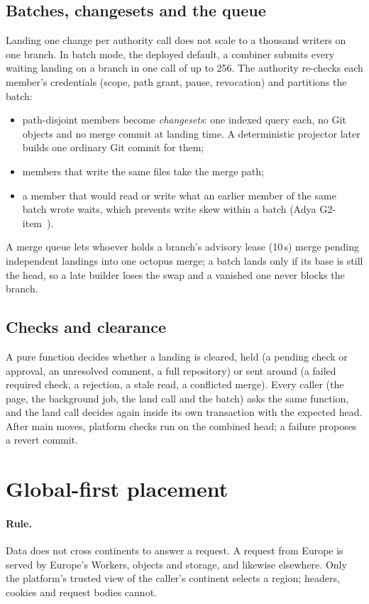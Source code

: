 \documentclass[11pt]{article}
\begin{document}
\subsection{Batches, changesets and the queue}

Landing one change per authority call does not scale to a thousand writers on one
branch. In batch mode, the deployed default, a combiner submits every waiting landing on
a branch in one call of up to 256. The authority re-checks each member's credentials
(scope, path grant, pause, revocation) and partitions the batch:
\begin{itemize}
\item path-disjoint members become \emph{changesets}: one indexed query each, no Git
  objects and no merge commit at landing time. A deterministic projector later builds
  one ordinary Git commit for them;
\item members that write the same files take the merge path;
\item a member that would read or write what an earlier member of the same batch wrote
  waits, which prevents write skew within a batch (Adya G2-item~\cite{adya2000isolation}).
\end{itemize}
A merge queue lets whoever holds a branch's advisory lease (10\,s) merge pending
independent landings into one octopus merge; a batch lands only if its base is still
the head, so a late builder loses the swap and a vanished one never blocks the branch.

\subsection{Checks and clearance}

A pure function decides whether a landing is cleared, held (a pending check or approval,
an unresolved comment, a full repository) or sent around (a failed required check, a
rejection, a stale read, a conflicted merge). Every caller (the page, the background
job, the land call and the batch) asks the same function, and the land call decides
again inside its own transaction with the expected head. After main moves, platform
checks run on the combined head; a failure proposes a revert commit.

\section{Global-first placement}
\label{sec:global}

\paragraph{Rule.} Data does not cross continents to answer a request. A request from
Europe is served by Europe's Workers, objects and storage, and likewise elsewhere.
Only the platform's trusted view of the caller's continent selects a region; headers,
cookies and request bodies cannot.
\end{document}
